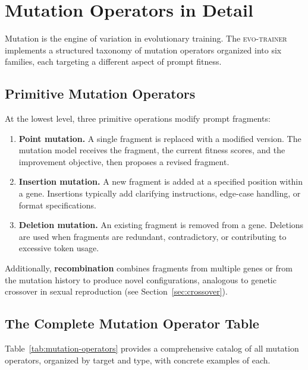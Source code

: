 \section{Mutation Operators in Detail}
\label{sec:mutation-strategies}

Mutation is the engine of variation in evolutionary training. The \textsc{evo-trainer} implements a structured taxonomy of mutation operators organized into six families, each targeting a different aspect of prompt fitness.

\subsection{Primitive Mutation Operators}

At the lowest level, three primitive operations modify prompt fragments:

\begin{enumerate}[leftmargin=1.8em]
  \item \textbf{Point mutation.} A single fragment is replaced with a modified version. The mutation model receives the fragment, the current fitness scores, and the improvement objective, then proposes a revised fragment.

  \item \textbf{Insertion mutation.} A new fragment is added at a specified position within a gene. Insertions typically add clarifying instructions, edge-case handling, or format specifications.

  \item \textbf{Deletion mutation.} An existing fragment is removed from a gene. Deletions are used when fragments are redundant, contradictory, or contributing to excessive token usage.
\end{enumerate}

Additionally, \textbf{recombination} combines fragments from multiple genes or from the mutation history to produce novel configurations, analogous to genetic crossover in sexual reproduction (see Section~\ref{sec:crossover}).

\subsection{The Complete Mutation Operator Table}

Table~\ref{tab:mutation-operators} provides a comprehensive catalog of all mutation operators, organized by target and type, with concrete examples of each.

